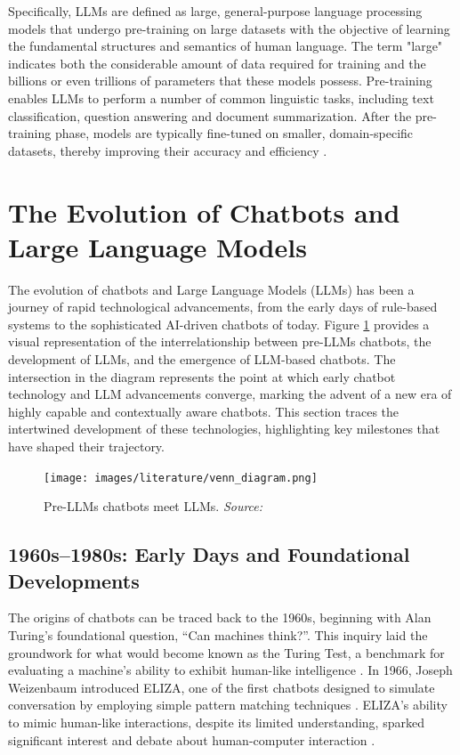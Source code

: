 Specifically, LLMs are defined as large, general-purpose language processing models that undergo pre-training on large datasets with the objective of learning the fundamental structures and semantics of human language. The term "large" indicates both the considerable amount of data required for training and the billions or even trillions of parameters that these models possess. Pre-training enables LLMs to perform a number of common linguistic tasks, including text classification, question answering and document summarization. After the pre-training phase, models are typically fine-tuned on smaller, domain-specific datasets, thereby improving their accuracy and efficiency \cite{researchgraph2024}.

\section{The Evolution of Chatbots and Large Language Models}

The evolution of chatbots and Large Language Models (LLMs) has been a journey of rapid technological advancements, from the early days of rule-based systems to the sophisticated AI-driven chatbots of today. Figure \ref{fig:chatbot_venn_diagram} provides a visual representation of the interrelationship between pre-LLMs chatbots, the development of LLMs, and the emergence of LLM-based chatbots. The intersection in the diagram represents the point at which early chatbot technology and LLM advancements converge, marking the advent of a new era of highly capable and contextually aware chatbots. This section traces the intertwined development of these technologies, highlighting key milestones that have shaped their trajectory.

\begin{figure}[h!]
    \centering
    \texttt{[image: images/literature/venn\_diagram.png]}
    \caption{Pre-LLMs chatbots meet LLMs. \textit{Source:} \cite{dam2024complete}}
    \label{fig:chatbot_venn_diagram}
\end{figure}

\subsection{1960s–1980s: Early Days and Foundational Developments}

The origins of chatbots can be traced back to the 1960s, beginning with Alan Turing’s foundational question, “Can machines think?”. This inquiry laid the groundwork for what would become known as the Turing Test, a benchmark for evaluating a machine’s ability to exhibit human-like intelligence \cite{turing2009computing}. In 1966, Joseph Weizenbaum introduced ELIZA, one of the first chatbots designed to simulate conversation by employing simple pattern matching techniques \cite{weizenbaum1966eliza}. ELIZA’s ability to mimic human-like interactions, despite its limited understanding, sparked significant interest and debate about human-computer interaction \cite{zimmerman2023human}.

